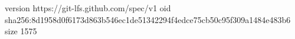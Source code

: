 version https://git-lfs.github.com/spec/v1
oid sha256:8d1958d0f6173d863b546ec1de51342294f4edce75cb50c95f309a1484e483b6
size 1575
